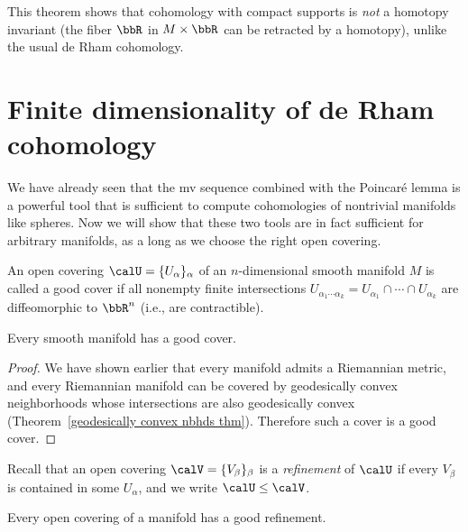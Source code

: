 \begin{rem}
    This theorem shows that cohomology with compact supports is \emph{not} a homotopy invariant (the fiber $\bbR$ in $M\times\bbR$ can be retracted by a homotopy), unlike the usual de Rham cohomology.
\end{rem}





\section{Finite dimensionality of de Rham cohomology}\label{finite dim de rham}

We have already seen that the \gls{mv} sequence combined with the Poincar\'e lemma is a powerful tool that is sufficient to compute cohomologies of nontrivial manifolds like spheres. Now we will show that these two tools are in fact sufficient for arbitrary manifolds, as a long as we choose the right open covering.

\begin{defn}
    An open covering $\calU=\{U_\alpha\}_\alpha$ of an $n$-dimensional smooth manifold $M$ is called a good cover if all nonempty finite intersections $U_{\alpha_1\cdots\alpha_k}=U_{\alpha_1}\cap \cdots\cap U_{\alpha_k}$ are diffeomorphic to $\bbR^n$ (i.e., are contractible).
\end{defn}

\begin{prop}
    Every smooth manifold has a good cover.
\end{prop}
\begin{proof}
     We have shown earlier that every manifold admits a Riemannian metric, and every Riemannian manifold can be covered by geodesically convex neighborhoods whose intersections are also geodesically convex (Theorem~\ref{geodesically convex nbhds thm}). Therefore such a cover is a good cover.
\end{proof}

Recall that an open covering $\calV=\{V_\beta\}_\beta$ is a \emph{refinement} of $\calU$ if every $V_\beta$ is contained in some $U_\alpha$, and we write $\calU\leq \calV$.

\begin{cor}
    Every open covering of a manifold has a good refinement.
\end{cor}

